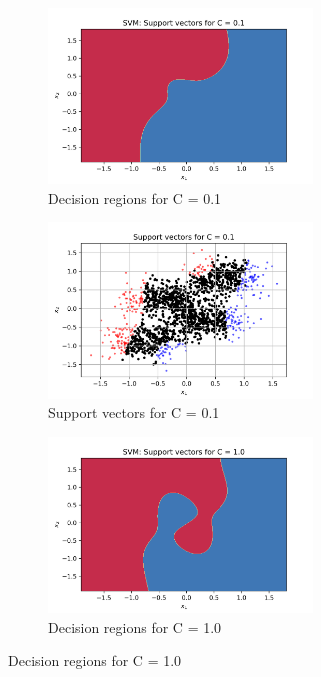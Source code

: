 \documentclass[a4paper]{article}    %
\begin{document}
\begin{figure}[H]
    \centering
    \begin{subfigure}{0.45\textwidth}
        \centering
        \includegraphics[width=7cm]{decision_region_C_0d1}
        \caption{Decision regions for C = 0.1}
        \label{fig:svm-decision_region_C_0d1}
    \end{subfigure}
    \hfill
    \begin{subfigure}{0.45\textwidth}
        \centering
        \includegraphics[width=7cm]{support_vectors_C_0d1}
        \caption{Support vectors for C = 0.1}
        \label{fig:svm-support_vectors_C_0d1}
    \end{subfigure}
    \begin{subfigure}{0.45\textwidth}
        \centering
        \includegraphics[width=7cm]{decision_region_C_1}
        \caption{Decision regions for C = 1.0}
        \label{fig:svm-decision_region_C_1}
    \end{subfigure}

\end{figure}
\end{document}
